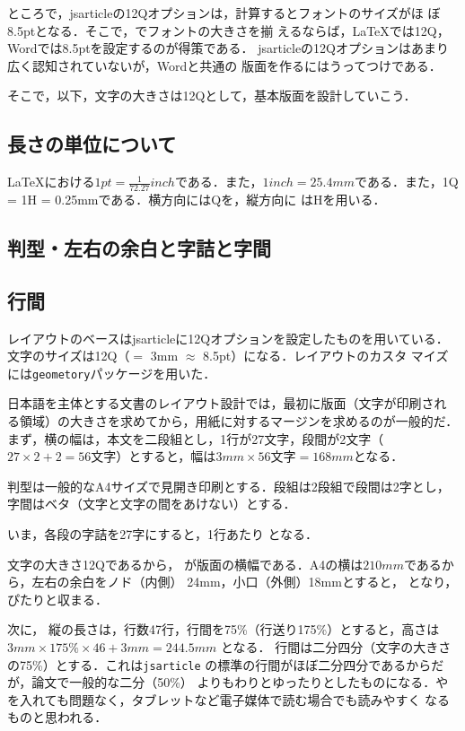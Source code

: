 \documentclass[a4j, 12Q, twocolumn, twoside]{jsarticle}
\begin{document}
  ところで，jsarticleの12Qオプションは，計算するとフォントのサイズがほ
  ぼ8.5ptとなる．そこで，でフォントの大きさを揃
  えるならば，\LaTeX では12Q，Wordでは8.5ptを設定するのが得策である．
  jsarticleの12Qオプションはあまり広く認知されていないが，Wordと共通の
  版面を作るにはうってつけである．

  そこで，以下，文字の大きさは12Qとして，基本版面を設計していこう．

\subsection{長さの単位について}
  \LaTeX における$1 pt = \frac{1}{72.27} inch$である．また，$1 inch =
  25.4 mm$である．また，1Q = 1H = 0.25mmである．横方向にはQを，縦方向に
  はHを用いる．
\subsection{判型・左右の余白と字詰と字間}


\subsection{行間}
レイアウトのベースはjsarticleに12Qオプションを設定したものを用いている．
文字のサイズは12Q（$=$ 3mm $\approx$ 8.5pt）になる．レイアウトのカスタ
マイズには\texttt{geometory}パッケージを用いた．

日本語を主体とする文書のレイアウト設計では，最初に版面（文字が印刷され
る領域）の大きさを求めてから，用紙に対するマージンを求めるのが一般的だ．
まず，横の幅は，本文を二段組とし，1行が27文字，段間が2文字（$27 \times
2 + 2 = 56$文字）とすると，幅は$3mm \times 56文字 = 168mm$となる．

  判型は一般的なA4サイズで見開き印刷とする．段組は2段組で段間は2字とし，
  字間はベタ（文字と文字の間をあけない）とする．

  いま，各段の字詰を27字にすると，1行あたり
\nlines{
  \[
   27字 + 2字 + 27字 = 56字
  \]
}
  となる．

  文字の大きさ12Qであるから，
\nlines{
  \[
   12Q \times 0.25 mm \times 56字 = 168 mm
  \]
}
  が版面の横幅である．A4の横は$210mm$であるから，左右の余白をノド（内側）
  24mm，小口（外側）18mmとすると，
\nlines{
  \[
   168mm + 24mm + 18mm = 210mm
  \]
}
  となり，ぴたりと収まる．


次に，
縦の長さは，行数47行，行間を75\%（行送り175\%）とすると，高さは$3mm
\times 175\% \times 46 + 3mm = 244.5mm$ となる．
  行間は二分四分（文字の大きさの75\%）とする．これは\texttt{jsarticle}
  の標準の行間がほぼ二分四分であるからだが，論文で一般的な二分（50\%）
  よりもわりとゆったりとしたものになる．やを入れても問題なく，タブレットなど電子媒体で読む場合でも読みやすく
  なるものと思われる．
\end{document}
